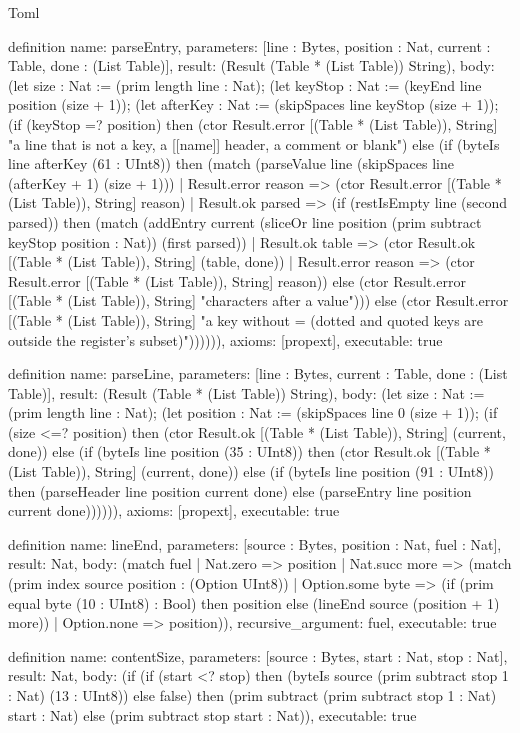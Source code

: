 \begin{lexlean}{Toml}
\begin{semanticmodule}
definition{
  name: parseEntry,
  parameters: [line : Bytes, position : Nat, current : Table, done : (List Table)],
  result: (Result (Table * (List Table)) String),
  body: (let size : Nat := (prim length line : Nat); (let keyStop : Nat := (keyEnd line position (size + 1)); (let afterKey : Nat := (skipSpaces line keyStop (size + 1)); (if (keyStop =? position) then (ctor Result.error [(Table * (List Table)), String] "a line that is not a key, a [[name]] header, a comment or blank") else (if (byteIs line afterKey (61 : UInt8)) then (match (parseValue line (skipSpaces line (afterKey + 1) (size + 1)))
    | Result.error reason => (ctor Result.error [(Table * (List Table)), String] reason)
    | Result.ok parsed => (if (restIsEmpty line (second parsed)) then (match (addEntry current (sliceOr line position (prim subtract keyStop position : Nat)) (first parsed))
      | Result.ok table => (ctor Result.ok [(Table * (List Table)), String] (table, done))
      | Result.error reason => (ctor Result.error [(Table * (List Table)), String] reason)) else (ctor Result.error [(Table * (List Table)), String] "characters after a value"))) else (ctor Result.error [(Table * (List Table)), String] "a key without = (dotted and quoted keys are outside the register's subset)")))))),
  axioms: [propext],
  executable: true
}

definition{
  name: parseLine,
  parameters: [line : Bytes, current : Table, done : (List Table)],
  result: (Result (Table * (List Table)) String),
  body: (let size : Nat := (prim length line : Nat); (let position : Nat := (skipSpaces line 0 (size + 1)); (if (size <=? position) then (ctor Result.ok [(Table * (List Table)), String] (current, done)) else (if (byteIs line position (35 : UInt8)) then (ctor Result.ok [(Table * (List Table)), String] (current, done)) else (if (byteIs line position (91 : UInt8)) then (parseHeader line position current done) else (parseEntry line position current done)))))),
  axioms: [propext],
  executable: true
}

definition{
  name: lineEnd,
  parameters: [source : Bytes, position : Nat, fuel : Nat],
  result: Nat,
  body: (match fuel
    | Nat.zero => position
    | Nat.succ more => (match (prim index source position : (Option UInt8))
      | Option.some byte => (if (prim equal byte (10 : UInt8) : Bool) then position else (lineEnd source (position + 1) more))
      | Option.none => position)),
  recursive_argument: fuel,
  executable: true
}

definition{
  name: contentSize,
  parameters: [source : Bytes, start : Nat, stop : Nat],
  result: Nat,
  body: (if (if (start <? stop) then (byteIs source (prim subtract stop 1 : Nat) (13 : UInt8)) else false) then (prim subtract (prim subtract stop 1 : Nat) start : Nat) else (prim subtract stop start : Nat)),
  executable: true
}


\end{semanticmodule}
\end{lexlean}

